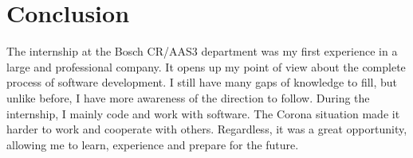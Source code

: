 \chapter{Conclusion}

The internship at the Bosch CR/AAS3 department was my first experience in a large and professional company. It opens up my point of view about the complete process of software development. I still have many gaps of knowledge to fill, but unlike before, I have more awareness of the direction to follow. During the internship, I mainly code and work with software. The Corona situation made it harder to work and cooperate with others. Regardless, it was a great opportunity, allowing me to learn, experience and prepare for the future.

